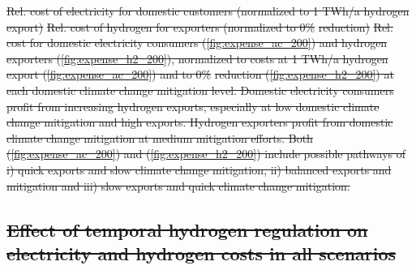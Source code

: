 \documentclass[5p,numafflabel]{elsarticle}
\newcommand{\co}{\ce{CO2}~}
\def\co{CO${}_2${\:}}
\providecommand{\DIFdeltex}[1]{{\protect\color{red}\sout{#1}}}                      %
\providecommand{\DIFdelFL}[1]{\DIFdel{#1}} %
\providecommand{\DIFdel}[1]{\texorpdfstring{\DIFdeltex{#1}}{}} %
\begin{document}
{%
\DIFdelFL{Rel. cost of electricity for domestic customers (normalized to 1 TWh/a hydrogen export)}}
{%
\DIFdelFL{Rel. cost of hydrogen for exporters (normalized to 0\% }%
\DIFdelFL{reduction)}}
{%
\DIFdelFL{Rel. cost for domestic electricity consumers (\ref{fig:expense_ac_200}) and hydrogen exporters (\ref{fig:expense_h2_200}),
    normalized to costs at 1 TWh/a hydrogen export (\ref{fig:expense_ac_200}) and
    to 0\% }%
\DIFdelFL{reduction (\ref{fig:expense_h2_200})
    at each domestic climate change mitigation level. Domestic electricity consumers profit from increasing hydrogen exports, especially at low domestic climate change mitigation and high exports. Hydrogen exporters profit from domestic climate change mitigation at medium mitigation efforts. Both (\ref{fig:expense_ac_200}) and (\ref{fig:expense_h2_200}) include possible pathways of i) quick exports and slow climate change mitigation, ii) balanced exports and mitigation and iii) slow exports and quick climate change mitigation.}}

\subsection{\DIFdel{Effect of temporal hydrogen regulation on electricity and hydrogen costs in all scenarios}} 
\addtocounter{subsection}{-1}%
\end{document}
